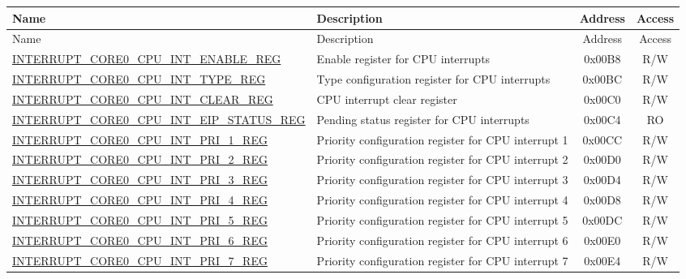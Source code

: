 
\begin{longtable}{ | p{8.0cm} | p{8.4cm} | c | c| }
\hline\rowcolor{lightgray}
Name & Description & Address & Access \\ \hline
\endfirsthead
\hline
\rowcolor{lightgray}
Name & Description & Address & Access  \\
\hline
\endhead
\endfoot

\hyperref[regdesc:INTERRUPTCORE0CPUINTENABLEREG]{INTERRUPT\_CORE0\_CPU\_INT\_ENABLE\_REG} & Enable register for CPU interrupts & 0x00B8 & R/W \\ \hline
\hyperref[regdesc:INTERRUPTCORE0CPUINTTYPEREG]{INTERRUPT\_CORE0\_CPU\_INT\_TYPE\_REG} & Type configuration register for CPU interrupts & 0x00BC & R/W \\ \hline
\hyperref[regdesc:INTERRUPTCORE0CPUINTCLEARREG]{INTERRUPT\_CORE0\_CPU\_INT\_CLEAR\_REG} & CPU interrupt clear register & 0x00C0 & R/W \\ \hline
\hyperref[regdesc:INTERRUPTCORE0CPUINTEIPSTATUSREG]{INTERRUPT\_CORE0\_CPU\_INT\_EIP\_STATUS\_REG} & Pending status register for CPU interrupts & 0x00C4 & RO \\ \hline
\hyperref[regdesc:INTERRUPTCORE0CPUINTPRI0REG]{INTERRUPT\_CORE0\_CPU\_INT\_PRI\_1\_REG} & Priority configuration register for CPU interrupt 1 & 0x00CC & R/W \\ \hline
\hyperref[regdesc:INTERRUPTCORE0CPUINTPRI0REG]{INTERRUPT\_CORE0\_CPU\_INT\_PRI\_2\_REG} & Priority configuration register for CPU interrupt 2 & 0x00D0 & R/W \\ \hline
\hyperref[regdesc:INTERRUPTCORE0CPUINTPRI0REG]{INTERRUPT\_CORE0\_CPU\_INT\_PRI\_3\_REG} & Priority configuration register for CPU interrupt 3 & 0x00D4 & R/W \\ \hline
\hyperref[regdesc:INTERRUPTCORE0CPUINTPRI0REG]{INTERRUPT\_CORE0\_CPU\_INT\_PRI\_4\_REG} & Priority configuration register for CPU interrupt 4 & 0x00D8 & R/W \\ \hline
\hyperref[regdesc:INTERRUPTCORE0CPUINTPRI0REG]{INTERRUPT\_CORE0\_CPU\_INT\_PRI\_5\_REG} & Priority configuration register for CPU interrupt 5 & 0x00DC & R/W \\ \hline
\hyperref[regdesc:INTERRUPTCORE0CPUINTPRI0REG]{INTERRUPT\_CORE0\_CPU\_INT\_PRI\_6\_REG} & Priority configuration register for CPU interrupt 6 & 0x00E0 & R/W \\ \hline
\hyperref[regdesc:INTERRUPTCORE0CPUINTPRI0REG]{INTERRUPT\_CORE0\_CPU\_INT\_PRI\_7\_REG} & Priority configuration register for CPU interrupt 7 & 0x00E4 & R/W \\ \hline

\end{longtable}
